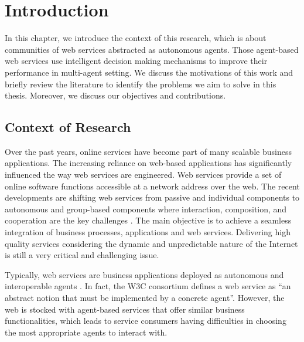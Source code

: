 %

\setcounter{chapter}{0}

\chapter{Introduction}\label{sec:intro}
In this chapter, we introduce the context of this research, which is about communities of web services abstracted as autonomous agents. Those agent-based web services use intelligent decision making mechanisms to improve their performance in multi-agent setting. We discuss the motivations of this work and briefly review the literature to identify the problems we aim to solve in this thesis. Moreover, we discuss our objectives and contributions.

\section{Context of Research}\label{sec:motivation}

Over the past years, online services have become part of many
scalable business applications. The increasing reliance on
web-based applications has significantly influenced the way web
services are engineered. Web services provide a set of online software functions accessible at a network address over the web.
The recent developments are shifting web services from passive and
individual components to autonomous and group-based components
where interaction, composition, and cooperation are the key
challenges \cite{ICWS2011-1,SCC2011-1}. The main objective is to
achieve a seamless integration of business processes, applications
and web services. Delivering high quality services considering the
dynamic and unpredictable nature of the Internet is still a very
critical and challenging issue.

Typically, web services are business applications deployed as
autonomous and interoperable agents \cite{Alescio}. In fact, the
W3C consortium defines a web service as ``an abstract notion that
must be implemented by a concrete agent''. However, the web is
stocked with agent-based services that offer similar business
functionalities, which leads to service consumers having
difficulties in choosing the most appropriate agents to interact
with.

